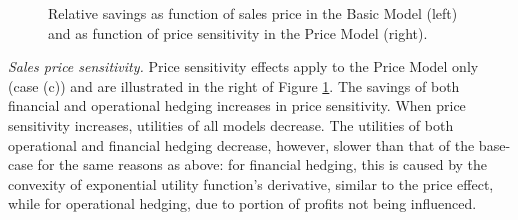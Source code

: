 \documentclass[mnsc,nonblindrev,copyedit]{informs2_wz} %
\begin{document}
\begin{figure}[ht]
\begin{center}
\begin{minipage}{6in}
    \begin{minipage}{3.1in}
        \epsfxsize=2.8in
    \hspace{-0.0in}    
    \end{minipage}
    \begin{minipage}{2.8in}
        \epsfxsize=2.8in
    \hspace{-0.0in}    
    \end{minipage}
\end{minipage}
\vspace{.05in} \caption{Relative savings as function of sales price in the Basic Model (left) and as function of price sensitivity in the Price Model (right).} \label{fig:priceAndSens}
\vspace{-.2in}
\end{center}
\end{figure}



{\noindent \em Sales price sensitivity.} Price sensitivity effects apply to the Price Model only (case (c)) and are illustrated in the right of Figure \ref{fig:priceAndSens}.  The savings of both financial and operational hedging increases in price sensitivity.  When price sensitivity increases, utilities of all models decrease.  The utilities of both operational and financial hedging decrease, however, slower than that of the base-case for the same reasons as above:  for financial hedging, this is caused by the convexity of exponential utility function's derivative, similar to the price effect, while for operational hedging, due to portion of profits not being influenced.
\end{document}
